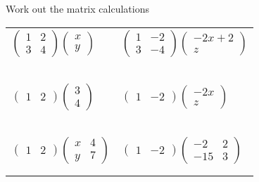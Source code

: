 \documentclass[fontsize=20pt]{scrartcl}
\begin{document}
\newpage
Work out the matrix calculations
\newline
\newline
\begin{tabular}{p{13cm}p{13cm}}
$\begin{pmatrix}1&2\\3&4 \end{pmatrix}\begin{pmatrix}x\\y \end{pmatrix}$
&$\begin{pmatrix}1&-2\\3&-4 \end{pmatrix} \begin{pmatrix}-2x+2\\z \end{pmatrix}$
\\\\\\
\\\\\\

$\begin{pmatrix}1&2 \end{pmatrix}\begin{pmatrix}3\\4 \end{pmatrix}$
&$\begin{pmatrix}1&-2 \end{pmatrix} \begin{pmatrix}-2x\\z \end{pmatrix}$
\\\\\\
\\\\\\

$\begin{pmatrix}1&2 \end{pmatrix}\begin{pmatrix}x&4\\y&7 \end{pmatrix}$
&$\begin{pmatrix}1&-2 \end{pmatrix} \begin{pmatrix}-2&2\\-15&3 \end{pmatrix}$
\\\\\\
\end{tabular}
\end{document}
